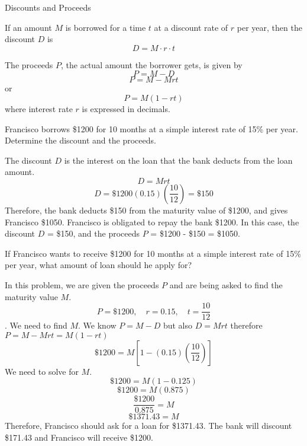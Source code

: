 \begin{summarybox}{Discounts and Proceeds}

    If an amount \( M \) is borrowed for a time \( t \) at a discount rate of \( r \) per year, then the discount \( D \) is
    \[ D = M \cdot r \cdot t \]

    The proceeds \( P \), the actual amount the borrower gets, is given by
    \[ P = M - D \]
    \[ P = M - Mrt \]
    or
    \[ P = M(1 - rt) \]
    where interest rate \( r \) is expressed in decimals.
\end{summarybox}

\begin{example}
    Francisco borrows \$1200 for 10 months at a simple interest rate of 15\% per year. Determine the discount and the proceeds.
\end{example}
\begin{solution}
    The discount \( D \) is the interest on the loan that the bank deducts from the loan amount.
    \[ D = Mrt \]
    \[ D = \$1200 \left(0.15\right) \left(\frac{10}{12}\right) = \$150 \]
    Therefore, the bank deducts \$150 from the maturity value of \$1200, and gives Francisco \$1050. Francisco is obligated to repay the bank \$1200.
    In this case, the discount \( D \) = \$150, and the proceeds \( P \) = \$1200 - \$150 = \$1050.
\end{solution}

\begin{example}
    If Francisco wants to receive \$1200 for 10 months at a simple interest rate of 15\% per year, what amount of loan should he apply for?
\end{example}
\begin{solution}
    In this problem, we are given the proceeds \( P \) and are being asked to find the maturity value \( M \).
    \[ P = \$1200, \quad r = 0.15, \quad t = \frac{10}{12} \]. We need to find \( M \).
    We know \( P = M - D \)
    but also \( D = Mrt \)
    therefore \( P = M - Mrt = M(1 - rt) \)
    \[ \$1200 = M\left[1 - (0.15)\left(\frac{10}{12}\right)\right] \]
    We need to solve for \( M \).
    \[ \$1200 = M(1 - 0.125) \]
    \[ \$1200 = M(0.875) \]
    \[ \frac{\$1200}{0.875} = M \]
    \[ \$1371.43 = M \]
    Therefore, Francisco should ask for a loan for \$1371.43.
    The bank will discount \$171.43 and Francisco will receive \$1200.
\end{solution}

